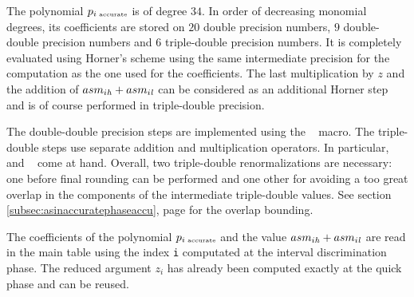 The polynomial $p_{i \mbox{\tiny ~accurate}}$ is of degree $34$. In
order of decreasing monomial degrees, its coefficients are stored on
$20$ double precision numbers, $9$ double-double precision numbers and
$6$ triple-double precision numbers. It is completely evaluated using
Horner's scheme using the same intermediate precision for the
computation as the one used for the coefficients. The last
multiplication by $z$ and the addition of $asm_{i\mathit{h}} + asm_{i\mathit{l}}$
can be considered as an additional Horner step and is of course
performed in triple-double precision.

The double-double precision steps are implemented using the
\MulAddDdD~ macro. The triple-double steps use separate addition and
multiplication operators. In particular, \AddTT~ and \MuldTT~ come at
hand. Overall, two triple-double renormalizations are necessary: one
before final rounding can be performed and one other for avoiding a
too great overlap in the components of the intermediate triple-double
values. See section \ref{subsec:asinaccuratephaseaccu}, page
\pageref{subsec:asinaccuratephaseaccu} for the overlap bounding.

The coefficients of the polynomial $p_{i \mbox{\tiny ~accurate}}$ and
the value $asm_{i\mathit{h}} + asm_{i\mathit{l}}$ are read in the main table using
the index {\tt i} computated at the interval discrimination phase. The
reduced argument $z_i$ has already been computed exactly at the quick
phase and can be reused.

